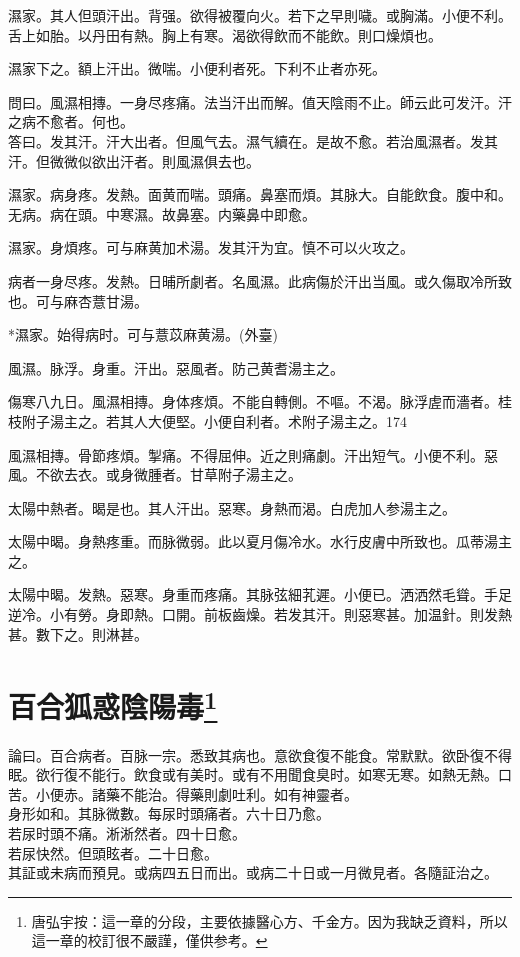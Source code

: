 濕家。其人但頭汗出。背强。欲得被覆向火。若下之早則噦。{\khaaitp 或}胸滿。小便{\khaaitp 不}利。舌上如胎。以丹田有熱。胸上有寒。渴欲得飲而不能飲。則口燥{\khaaitp 煩}也。

濕家下之。額上汗出。微喘。小便利者死。下利不止者亦死。

問曰。風濕相摶。一身尽疼痛。法当汗出而解。值天陰雨不止。師云此可发汗。汗之病不愈者。何也。\\
答曰。发其汗。汗大出者。但風气去。濕气續在。是故不愈。若治風濕者。发其汗。但微微似欲出汗者。則風濕俱去也。

濕家。病身疼。发熱。面黄而喘。頭痛。鼻塞而煩。其脉大。自能飲食。腹中和。无病。病在頭。中寒濕。故鼻塞。内藥鼻中即愈。

濕家。身煩疼。可与麻黄加术湯。发其汗为宜。慎不可以火攻之。

病者一身尽疼。发熱。日晡所劇者。名風濕。此病傷於汗出当風。或久傷取冷所致也。可与麻杏薏甘湯。

*濕家。始得病时。可与薏苡麻黄湯。(外臺)

風濕。脉浮。身重。汗出。惡風者。防己黄耆湯主之。

傷寒八九日。風濕相摶。身体疼煩。不能自轉側。不嘔。不渴。脉浮虗而濇者。桂枝附子湯主之。若其人大便堅。小便自利者。术附子湯主之。174

風濕相摶。骨節疼煩。掣痛。不得屈伸。近之則痛劇。汗出短气。小便不利。惡風。不欲去衣。或身微腫者。甘草附子湯主之。

太陽中熱者。暍是也。其人汗出。惡寒。身熱而渴。白虎{\khaaitp 加人参}湯主之。

太陽中暍。身熱疼重。而脉微弱。此以夏月傷冷水。水行皮膚中所致也。瓜蒂湯主之。

太陽中暍。发熱。惡寒。身重而疼痛。其脉弦細芤遲。小便已。洒洒然毛聳。手足逆冷。小有勞。身即熱。口開。前板齒燥。若发其汗。則惡寒甚。加温針。則发熱甚。數下之。則淋甚。

\chapter{百合狐惑陰陽毒{\footnote{唐弘宇按：這一章的分段，主要依據醫心方、千金方。因为我缺乏資料，所以這一章的校訂很不嚴謹，僅供参考。}}}

論曰。百合病者。百脉一宗。悉致其病也。意欲食復不能食。常默默。欲卧{\khaaitp 復}不得眠。欲行{\khaaitp 復}不能行。飲食或有美时。或有不用聞食臭时。如寒无寒。如熱无熱。口苦。小便赤。諸藥不能治。得藥則劇吐利。如有神靈者。\\
身形如和。其脉微數。每尿时頭痛者。六十日乃愈。\\
若尿时頭不痛。淅{\khaaitp 淅}然者。四十日愈。\\
若尿快然。但頭眩者。二十日愈。\\
其証或未病而預見。或病四五日而出。或病二十日或一月微見者。各隨証治之。

